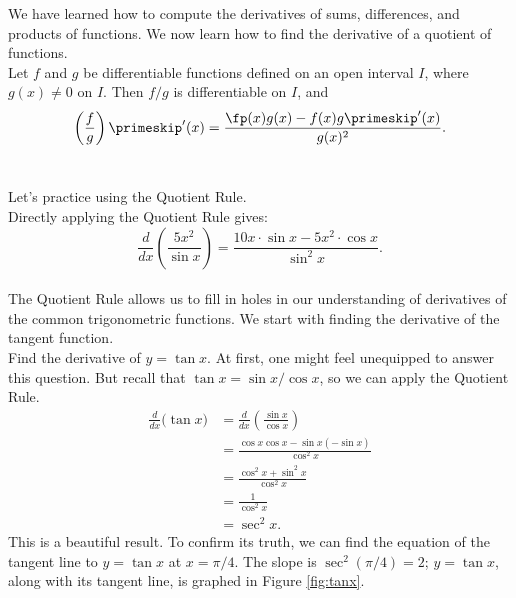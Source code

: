 We have learned how to compute the derivatives of sums, differences, and products of functions. We now learn how to find the derivative of a quotient of functions.\\

{Let $f$ and $g$ be differentiable functions defined on an open interval $I$, where $g(x) \neq 0$ on $I$. Then $f/g$ is differentiable on $I$, and 
\[
\left(\frac{f}{g}\right)\primeskip'(x) = \frac{\fp(x)g(x) - f(x)g\primeskip'(x)}{g(x)^2}.
\]
}\\


Let's practice using the Quotient Rule.\\

{Directly applying the Quotient Rule gives:
	\[
	\frac{d}{dx}\left(\frac{5x^2}{\sin x}\right) = \frac{10x\cdot\sin x - 5x^2\cdot \cos x}{\sin^2x}.
	\]
\baselineskip
}\\

The Quotient Rule allows us to fill in holes in our understanding of derivatives of the common trigonometric functions. We start with finding the derivative of the tangent function.\\

{Find the derivative of $y=\tan x$.}
{At first, one might feel unequipped to answer this question. But recall that $\tan x = \sin x/\cos x$, so we can apply the Quotient Rule.
		\begin{align*}
		\frac{d}{dx}\Big(\tan x\Big) &= \frac{d}{dx}\left(\frac{\sin x}{\cos x}\right) \\
																	&=	\frac{\cos x \cos x - \sin x (-\sin x)}{\cos^2 x} \\
																	&= \frac{\cos^2x+\sin^2x}{\cos^2x}\\
																	&= \frac{1}{\cos^2x} \\
																	&= \sec ^2 x.
		\end{align*}
This is a beautiful result. To confirm its truth, we can find the equation of the tangent line to $y=\tan x$ at $x=\pi/4$. The slope is $\sec^2(\pi/4) = 2$; $y=\tan x$, along with its tangent line, is graphed in Figure \ref{fig:tanx}.
}\\

